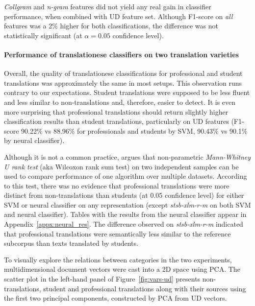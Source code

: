 \textit{Collgram} and \textit{n-gram} features did not yield any real gain in classifier performance, when combined with UD feature set. Although F1-score on \textit{all} features was a 2\% higher for both classifications, the difference was not statistically significant (at $\alpha=0.05$ confidence level).


\paragraph{Performance of translationese classifiers on two translation varieties}
Overall, the quality of translationese classifications for professional and student translations was approximately the same in most setups. This observation runs contrary to our expectations. Student translations were supposed to be less fluent and less similar to non-translations and, therefore, easier to detect. 
It is even more surprising that professional translations should return slightly higher classification results than student translations, particularly on UD features (F1-score 90.22\% vs 88.96\% for professionals and students by SVM, 90.43\% vs 90.1\% by neural classifier).

Although it is not a common practice, \citet{Demvsar2006} argues that non-parametric \textit{Mann-Whitney U rank test} (aka Wilcoxon rank sum test) on two independent samples can be used to compare performance of one algorithm over multiple datasets. 
According to this test, there was no evidence that professional translations were more distinct from non-translations than students (at 0.05 confidence level) for either SVM or neural classifier on any representation (except \textit{stsb-xlm-r-m} on both SVM and neural classifier). Tables with the results from the neural classifier appear in Appendix~\ref{appx:neural_res}.
The difference observed on \textit{stsb-xlm-r-m} indicated that professional translations were semantically less similar to the reference subcorpus than texts translated by students.

To visually explore the relations between categories in the two experiments, multidimensional document vectors  were cast into a 2D space using PCA. 
The scatter plot in the left-hand panel of Figure~\ref{fig:vars-ud} presents non-translations, student and professional translations along with their sources using the first two principal components, constructed by PCA from UD vectors.

